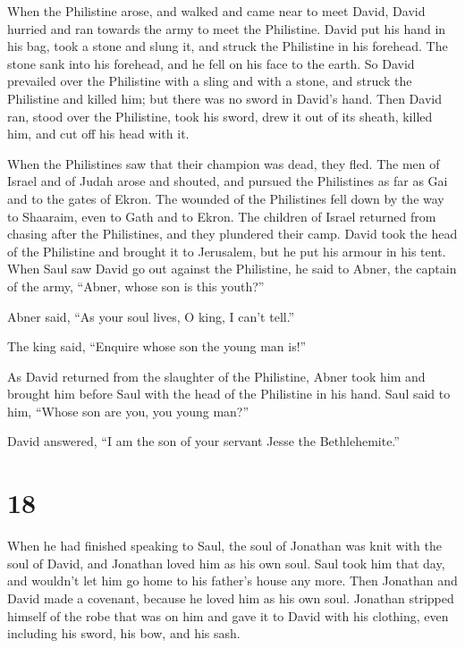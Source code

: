  When the Philistine arose, and walked and came near to
meet David, David hurried and ran towards the army to meet the
Philistine.  David put his hand in his bag, took a stone
and slung it, and struck the Philistine in his forehead. The stone sank
into his forehead, and he fell on his face to the earth. 
So David prevailed over the Philistine with a sling and with a stone,
and struck the Philistine and killed him; but there was no sword in
David's hand.  Then David ran, stood over the Philistine,
took his sword, drew it out of its sheath, killed him, and cut off his
head with it.

When the Philistines saw that their champion was dead, they fled.
 The men of Israel and of Judah arose and shouted, and
pursued the Philistines as far as Gai and to the gates of Ekron. The
wounded of the Philistines fell down by the way to Shaaraim, even to
Gath and to Ekron.  The children of Israel returned from
chasing after the Philistines, and they plundered their camp.
 David took the head of the Philistine and brought it to
Jerusalem, but he put his armour in his tent.  When Saul
saw David go out against the Philistine, he said to Abner, the captain
of the army, ``Abner, whose son is this youth?''

Abner said, ``As your soul lives, O king, I can't tell.''

 The king said, ``Enquire whose son the young man is!''

 As David returned from the slaughter of the Philistine,
Abner took him and brought him before Saul with the head of the
Philistine in his hand.  Saul said to him, ``Whose son
are you, you young man?''

David answered, ``I am the son of your servant Jesse the Bethlehemite.''

\hypertarget{section-17}{%
\section{18}\label{section-17}}

 When he had finished speaking to Saul, the soul of
Jonathan was knit with the soul of David, and Jonathan loved him as his
own soul.  Saul took him that day, and wouldn't let him go
home to his father's house any more.  Then Jonathan and
David made a covenant, because he loved him as his own soul.
 Jonathan stripped himself of the robe that was on him and
gave it to David with his clothing, even including his sword, his bow,
and his sash.

